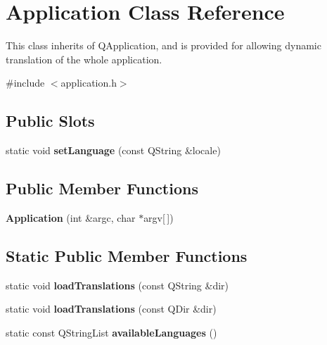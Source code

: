 \hypertarget{class_application}{
\section{Application Class Reference}
\label{class_application}
}


This class inherits of QApplication, and is provided for allowing dynamic translation of the whole application.  




{\ttfamily \#include $<$application.h$>$}

\subsection*{Public Slots}
\begin{DoxyCompactItemize}
\item 
\hypertarget{class_application_ad09f7d0bdb23828a307660e9cb883f18}{
static void {\bfseries setLanguage} (const QString \&locale)}
\label{class_application_ad09f7d0bdb23828a307660e9cb883f18}

\end{DoxyCompactItemize}
\subsection*{Public Member Functions}
\begin{DoxyCompactItemize}
\item 
\hypertarget{class_application_a45b8f2a74ef149181b7ffe0909e55afe}{
{\bfseries Application} (int \&argc, char $\ast$argv\mbox{[}$\,$\mbox{]})}
\label{class_application_a45b8f2a74ef149181b7ffe0909e55afe}

\end{DoxyCompactItemize}
\subsection*{Static Public Member Functions}
\begin{DoxyCompactItemize}
\item 
\hypertarget{class_application_a5ac24978e832e40c615a059071b4a497}{
static void {\bfseries loadTranslations} (const QString \&dir)}
\label{class_application_a5ac24978e832e40c615a059071b4a497}

\item 
\hypertarget{class_application_ad15db337112c298907c5840b2b78ba79}{
static void {\bfseries loadTranslations} (const QDir \&dir)}
\label{class_application_ad15db337112c298907c5840b2b78ba79}

\item 
\hypertarget{class_application_a87f69626136d86306f2ab0f48e50b692}{
static const QStringList {\bfseries availableLanguages} ()}
\label{class_application_a87f69626136d86306f2ab0f48e50b692}

\end{DoxyCompactItemize}


